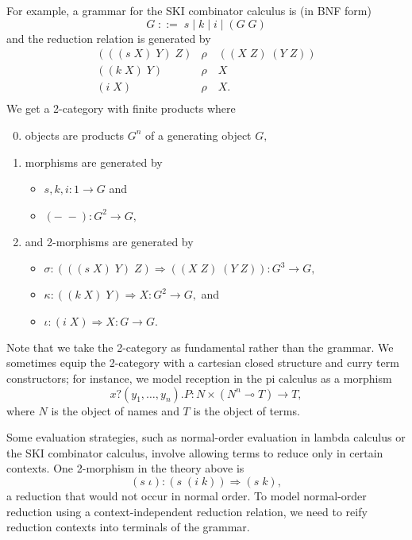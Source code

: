 \documentclass[]{acm_proc_article-sp}
\numberwithin{equation}{subsection}
\begin{document}
For example, a grammar for the SKI combinator calculus is (in BNF form)
\[ G\; ::=\; s\; |\; k\; |\; i\; |\; (G\; G) \]
and the reduction relation is generated by
\[\begin{array}{rl}
  (((s\; X)\; Y)\; Z) & \rho\quad ((X\; Z)\; (Y\; Z))\\
  ((k\; X)\; Y) & \rho\quad X\\
  (i\; X) & \rho\quad X.\\
\end{array}\]
We get a 2-category with finite products where
\begin{enumerate}
  \setcounter{enumi}{-1}
  \item objects are products $G^n$ of a generating object $G,$
  \item morphisms are generated by
  \begin{itemize}
    \item $s, k, i\colon 1 \to G$ and
    \item $(-\;-)\colon G^2 \to G,$
  \end{itemize}
  \item and 2-morphisms are generated by
  \begin{itemize}
    \item $\sigma\colon (((s\; X)\; Y)\; Z) \Rightarrow ((X\; Z)\; (Y\; Z)) \colon {G^3 \to G},$
    \item $\kappa\colon ((k\; X)\; Y) \Rightarrow X \colon {G^2 \to G},$ and
    \item $\iota\colon (i\; X) \Rightarrow X \colon {G \to G}.$
  \end{itemize}
\end{enumerate}

Note that we take the 2-category as fundamental rather than the grammar.  We sometimes equip the 2-category with a cartesian closed structure and curry term constructors; for instance, we model reception in the pi calculus as a morphism
\[ x?(y_1, \ldots, y_n).P\colon N \times (N^n \multimap T) \to T, \]
where $N$ is the object of names and $T$ is the object of terms.  

Some evaluation strategies, such as normal-order evaluation in lambda calculus or the SKI combinator calculus, involve allowing terms to reduce only in certain contexts.  One 2-morphism in the theory above is
\[ (s\; \iota)\colon (s\; (i\; k)) \Rightarrow (s\; k),\]
a reduction that would not occur in normal order.  To model normal-order reduction using a context-independent reduction relation, we need to reify reduction contexts into terminals of the grammar.
\end{document}
